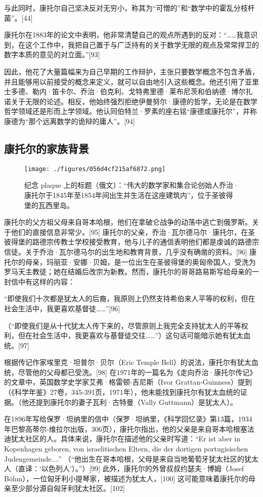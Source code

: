 与此同时，康托尔自己坚决反对无穷小，称其为“可憎的”和“数学中的霍乱分枝杆菌”。[44]

康托尔在1883年的论文中表明，他非常清楚自己的观点所遇到的反对：“……我意识到，在这个工作中，我把自己置于与广泛持有的关于数学无限的观点及常常捍卫的数字本质的意见的对立面。”[93]

因此，他花了大量篇幅来为自己早期的工作辩护，主张只要数学概念不包含矛盾，并且能够用以前接受的概念来定义，就可以自由地引入这些概念。他还引用了亚里士多德、勒内·笛卡尔、乔治·伯克利、戈特弗里德·莱布尼茨和伯纳德·博尔扎诺关于无限的论述。相反，他始终强烈拒绝伊曼努尔·康德的哲学，无论是在数学哲学领域还是形而上学领域。他认同伯特兰·罗素的座右铭“康德或康托尔”，并称康德为“那个远离数学的诡辩的庸人”。[94]
\subsection{康托尔的家族背景}
\begin{figure}[ht]
\centering
\texttt{[image: ./figures/056d4cf215af6872.png]}
\caption{纪念 plaque 上的标题（俄文）：“伟大的数学家和集合论创始人乔治·康托尔于1845年至1854年间出生并生活在这座建筑内”，位于圣彼得堡的瓦西里岛。} \label{fig_Canto_6}
\end{figure}
康托尔的父方祖父母来自哥本哈根，他们在拿破仑战争的动荡中逃亡到俄罗斯。关于他们的直接信息非常少。[95] 康托尔的父亲，乔治·瓦尔德马尔·康托尔，在圣彼得堡的路德宗传教士学校接受教育，他与儿子的通信表明他们都是虔诚的路德宗信徒。关于乔治·瓦尔德马尔的出生地和教育背景，几乎没有确凿的资料。[96] 康托尔的母亲，玛丽亚·安娜·贝姆，是一位出生在圣彼得堡的奥匈帝国人，受洗为罗马天主教徒；她在结婚后改宗为新教。然而，康托尔的哥哥路易斯写给母亲的一封信中有这样的内容：

“即使我们十次都是犹太人的后裔，我原则上仍然支持希伯来人平等的权利，但在社会生活中，我更喜欢基督徒……”[96]

（“即使我们是从十代犹太人传下来的，尽管原则上我完全支持犹太人的平等权利，但在社会生活中，我更喜欢与基督徒交往……”）这句话可能暗示她有犹太血统。[97]

根据传记作家埃里克·坦普尔·贝尔（Eric Temple Bell）的说法，康托尔有犹太血统，尽管他的父母都已受洗。[98] 在1971年的一篇名为《走向乔治·康托尔传记》的文章中，英国数学史学家艾弗·格雷顿-吉尼斯（Ivor Grattan-Guinness）提到（《科学年鉴》27卷，345-391页，1971年），他未能找到康托尔有犹太血统的证据。（他还提到康托尔的妻子瓦利·古特曼（Vally Guttmann）是犹太人）。

在1896年写给保罗·坦纳里的信中（保罗·坦纳里，《科学回忆录》第13篇，1934年巴黎高蒂尔-维拉尔出版，306页），康托尔指出，他的父亲是来自哥本哈根塞法迪犹太社区的人。具体来说，康托尔在描述他的父亲时写道：“Er ist aber in Kopenhagen geboren, von israelitischen Eltern, die der dortigen portugisischen Judengemeinde....” （“他出生在哥本哈根，父母是来自当地葡萄牙犹太社区的犹太人（直译：‘以色列人’）。”）[99] 此外，康托尔的外曾叔叔约瑟夫·博姆（Josef Böhm），一位匈牙利小提琴家，被描述为犹太人，[100] 这可能意味着康托尔的母亲至少部分源自匈牙利犹太社区。[102]

